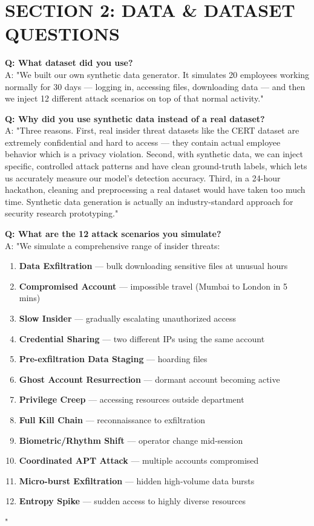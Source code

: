 \documentclass[12pt,a4paper]{article}
\begin{document}
\section*{SECTION 2: DATA \& DATASET QUESTIONS}

\textbf{Q: What dataset did you use?} \\
A: "We built our own synthetic data generator. It simulates 20 employees working normally for 30 days — logging in, accessing files, downloading data — and then we inject 12 different attack scenarios on top of that normal activity."
\vspace{10pt}

\textbf{Q: Why did you use synthetic data instead of a real dataset?} \\
A: "Three reasons. First, real insider threat datasets like the CERT dataset are extremely confidential and hard to access — they contain actual employee behavior which is a privacy violation. Second, with synthetic data, we can inject specific, controlled attack patterns and have clean ground-truth labels, which lets us accurately measure our model's detection accuracy. Third, in a 24-hour hackathon, cleaning and preprocessing a real dataset would have taken too much time. Synthetic data generation is actually an industry-standard approach for security research prototyping."
\vspace{10pt}

\textbf{Q: What are the 12 attack scenarios you simulate?} \\
A: "We simulate a comprehensive range of insider threats:
\begin{enumerate}[itemsep=2pt,parsep=0pt]
    \item \textbf{Data Exfiltration} — bulk downloading sensitive files at unusual hours
    \item \textbf{Compromised Account} — impossible travel (Mumbai to London in 5 mins)
    \item \textbf{Slow Insider} — gradually escalating unauthorized access
    \item \textbf{Credential Sharing} — two different IPs using the same account
    \item \textbf{Pre-exfiltration Data Staging} — hoarding files
    \item \textbf{Ghost Account Resurrection} — dormant account becoming active
    \item \textbf{Privilege Creep} — accessing resources outside department
    \item \textbf{Full Kill Chain} — reconnaissance to exfiltration
    \item \textbf{Biometric/Rhythm Shift} — operator change mid-session
    \item \textbf{Coordinated APT Attack} — multiple accounts compromised
    \item \textbf{Micro-burst Exfiltration} — hidden high-volume data bursts
    \item \textbf{Entropy Spike} — sudden access to highly diverse resources
\end{enumerate}"
\vspace{10pt}
\end{document}
